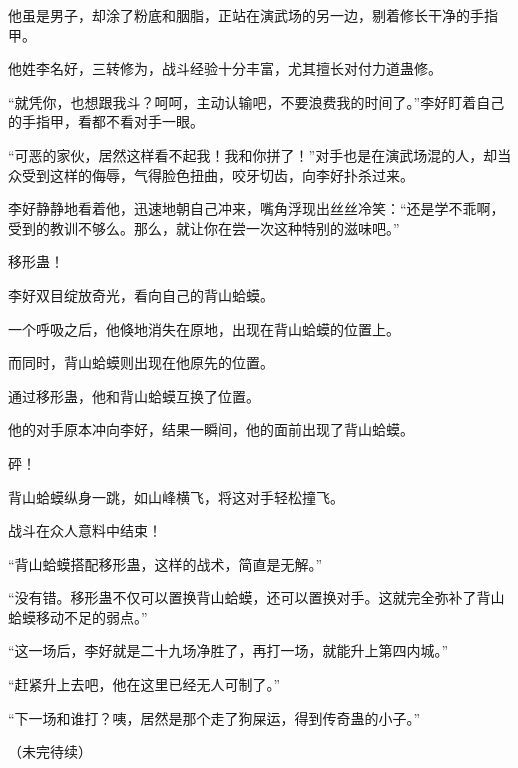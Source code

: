 \begin{this_body}
他虽是男子，却涂了粉底和胭脂，正站在演武场的另一边，剔着修长干净的手指甲。

他姓李名好，三转修为，战斗经验十分丰富，尤其擅长对付力道蛊修。

“就凭你，也想跟我斗？呵呵，主动认输吧，不要浪费我的时间了。”李好盯着自己的手指甲，看都不看对手一眼。

“可恶的家伙，居然这样看不起我！我和你拼了！”对手也是在演武场混的人，却当众受到这样的侮辱，气得脸色扭曲，咬牙切齿，向李好扑杀过来。

李好静静地看着他，迅速地朝自己冲来，嘴角浮现出丝丝冷笑：“还是学不乖啊，受到的教训不够么。那么，就让你在尝一次这种特别的滋味吧。”

移形蛊！

李好双目绽放奇光，看向自己的背山蛤蟆。

一个呼吸之后，他倏地消失在原地，出现在背山蛤蟆的位置上。

而同时，背山蛤蟆则出现在他原先的位置。

通过移形蛊，他和背山蛤蟆互换了位置。

他的对手原本冲向李好，结果一瞬间，他的面前出现了背山蛤蟆。

砰！

背山蛤蟆纵身一跳，如山峰横飞，将这对手轻松撞飞。

战斗在众人意料中结束！

“背山蛤蟆搭配移形蛊，这样的战术，简直是无解。”

“没有错。移形蛊不仅可以置换背山蛤蟆，还可以置换对手。这就完全弥补了背山蛤蟆移动不足的弱点。”

“这一场后，李好就是二十九场净胜了，再打一场，就能升上第四内城。”

“赶紧升上去吧，他在这里已经无人可制了。”

“下一场和谁打？咦，居然是那个走了狗屎运，得到传奇蛊的小子。”

（未完待续）

\end{this_body}

